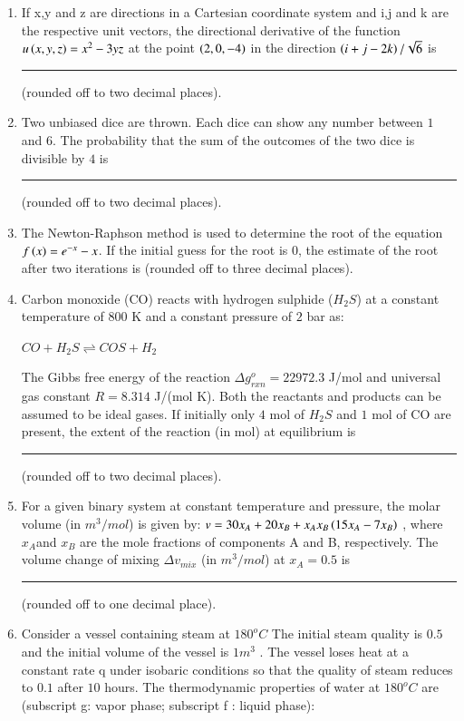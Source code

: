 \documentclass[journal]{IEEEtran}
\begin{document}
\begin{enumerate}
    \item If x,y and z are directions in a Cartesian coordinate system and i,j and k are the respective unit vectors, the directional derivative of the function $u\left(x,y,z\right) = x^2 - 3yz$ at the point $\left(2, 0,-4\right)$ in the direction $\left(i+j-2k\right)/\sqrt{6}$ is \rule{2cm}{0.1mm} (rounded off to two decimal places).

    \item Two unbiased dice are thrown. Each dice can show any number between $1$ and $6$. The probability that the sum of the outcomes of the two dice is divisible by $4$ is \rule{1cm}{0.1mm}(rounded off to two decimal places).

    \item The Newton-Raphson method is used to determine the root of the equation $f\left(x\right) = e^{-x} - x$. If the initial guess for the root is $0$, the estimate of the root after two iterations is (rounded off to three decimal places). 

    \item Carbon monoxide (CO) reacts with hydrogen sulphide ($H_2S$) at a constant temperature of $800$ K and a constant pressure of $2$ bar as: 
    \begin{center}
        $CO + H_2S \rightleftharpoons COS + H_2$
    \end{center}
    The Gibbs free energy of the reaction $\Delta g^{o}_{rxn} = 22972.3$ J/mol and universal gas constant $R = 8.314$ J/(mol K). Both the reactants and products can be assumed to be ideal gases. If initially only $4$ mol of $H_2S$ and $1$ mol of CO are present, the extent of the reaction (in mol) at equilibrium is \rule{1.5cm}{0.1mm}(rounded off to two decimal places).

    \item For a given binary system at constant temperature and pressure, the molar volume (in $m^3/mol$) is given by: $v = 30x_A + 20x_B + x_Ax_B\left(15x_A - 7x_B\right)$ , where $x_A $and $x_B$ are the mole fractions of components A and B, respectively. The volume change of mixing $\Delta v_{mix}$ (in $m^3/mol$) at $x_A = 0.5$ is \rule{1.5cm}{0.1mm}(rounded off to one decimal place). 

    \item Consider a vessel containing steam at $180^oC$ The initial steam quality is $0.5$ and the initial volume of the vessel is $1 m^3$ . The vessel loses heat at a constant rate q under isobaric conditions so that the quality of steam reduces to $0.1$ after $10$ hours. The thermodynamic properties of water at $180^oC$ are (subscript g: vapor phase; subscript f : liquid phase): 
    

\end{enumerate}
\end{document}
